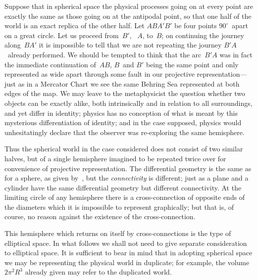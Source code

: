 \documentclass[12pt]{book}
\begin{document}
Suppose that in spherical space the physical processes going on at every
point are exactly the same as those going on at the antipodal point, so that
one half of the world is an exact replica of the other half. Let $ABA'B'$ be
four points $90^{\circ}$~apart on a great circle. Let us proceed from~$B'$, ~$A$, to~$B$;
on continuing the journey along~$BA'$ it is impossible to tell that we are not
repeating the journey $B'A$~already performed. We should be tempted to think
that the arc~$B'A$ was in fact the immediate continuation of~$AB$, $B$~and $B'$
being the same point and only represented as wide apart through some fault
in our projective representation---just as in a Mercator Chart we see the same
Behring Sea represented at both edges of the map. We may leave to the
metaphysicist the question whether two objects can be exactly alike, both
intrinsically and in relation to all surroundings, and yet differ in identity;
physics has no conception of what is meant by this mysterious differentiation
of identity; and in the case supposed, physics would unhesitatingly declare
that the observer was re-exploring the same hemisphere.

Thus the spherical world in the case considered does not consist of two
similar halves, but of a single hemisphere imagined to be repeated twice over
for convenience of projective representation. The differential geometry is the
same as for a sphere, as given by~, but the \emph{connectivity} is different; just
as a plane and a cylinder have the same differential geometry but different
connectivity. At the limiting circle of any hemisphere there is a cross-connection
of opposite ends of the diameters which it is impossible to represent
graphically; but that is, of course, no reason against the existence of the
cross-connection.

This hemisphere which returns on itself by cross\hyp{}con\-nec\-tions is the type
of elliptical space. In what follows we shall not need to give separate consideration
to elliptical space. It is sufficient to bear in mind that in adopting
spherical space we may be representing the physical world in duplicate; for
example, the volume $2\pi^{2} R^{3}$ already given may refer to the duplicated world.
\end{document}
